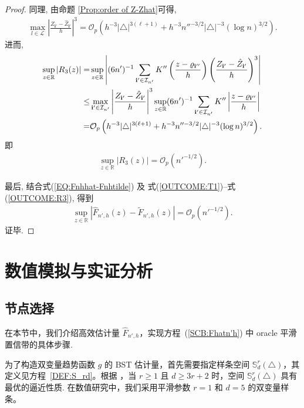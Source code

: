 \documentclass[a4paper,openay,14pt]{ctexbook}
\numberwithin{equation}{section}
\numberwithin{lem}{section}
\newcommand{\chapterwithfancyheader}[1]{  
    \chapter{#1} %
    \thispagestyle{fancy} %
}
\begin{document}
\begin{proof}
同理, 由命题 \ref{Prop:order of Z-Zhat}可得,
\begin{align*}
            \max_{l\in\mathcal{L}}\left\vert\frac{Z_{\mathbf{i}'}-\hat{Z}_{\mathbf{i}'}}{h}\right\vert^3 = \mathcal{O}_p\left(h^{-3}\vert\triangle\vert^{3(\ell+1)}+h^{-3}n''^{-3/2}\vert\triangle\vert^{-3}(\log n)^{3/2}\right).
        \end{align*}
进而,
\begin{align*}
            \sup_{z\in\mathbb{R}}\left\vert R_3(z)\right\vert = & \sup_{z\in\mathbb{R}}\left\vert (6n')^{-1}\sum_{\mathbf{i}'\in\mathcal{I}_{n'}}K''\left(\frac{z-\varrho_{\mathbf{i}''}}{h}\right)\left(\frac{Z_{\mathbf{i}'}-\hat{Z}_{\mathbf{i}'}}{h}\right)^3\right\vert\notag\\
            \leq& \max_{\mathbf{i}'\in\mathcal{I}_{n'}}\left\vert\frac{Z_{\mathbf{i}'}-\hat{Z}_{\mathbf{i}'}}{h}\right\vert^3\sup_{z\in\mathbb{R}}(6n')^{-1}\sum_{\mathbf{i}'\in\mathcal{I}_{n'}}K''\left\vert\frac{z-\varrho_{\mathbf{i}''}}{h}\right\vert\notag\\
            =& \mathcal{O}_p\left(h^{-3}\vert\triangle\vert^{3(\ell+1)}+h^{-3}n''^{-3/2}\vert\triangle\vert^{-3}(\log n)^{3/2}\right).\notag
        \end{align*}
        即
    \begin{align}\label{OUTCOME:R3}
                \sup_{z\in\mathbb{R}}\left\vert R_3(z)\right\vert = {\scriptstyle\mathcal{O}}_p(n'^{-1/2}).
            \end{align}

最后, 结合式(\ref{EQ:Fnhhat-Fnhtilde}) 及
式(\ref{OUTCOME:T1})–式(\ref{OUTCOME:R3}), 得到
\begin{align*}
    \sup_{z\in\mathbb{R}}
    \left|\hat{F}_{n',h}(z)-\tilde{F}_{n',h}(z)\right|
    ={\scriptstyle\mathcal{O}}_p\left(n'^{-1/2}\right).
\end{align*}
证毕.

\end{proof}


\chapterwithfancyheader{数值模拟与实证分析}\label{SEC: application}

\section{节点选择}
在本节中，我们介绍高效估计量 $\hat{F}_{n',h}$，实现方程~(\ref{SCB:Fhatn'h}) 中 oracle 平滑置信带的具体步骤.

为了构造双变量趋势函数 $g$ 的 BST 估计量，首先需要指定样条空间 $\mathbb{S}_{d}^{r}(\triangle)$，其定义见方程~\eqref{DEF:S_rd}。根据 \cite{lai2007spline}，当 $r \geq 1$ 且 $d \geq 3r + 2$ 时，空间 $\mathbb{S}_{d}^{r}(\triangle)$ 具有最优的逼近性质. 在数值研究中，我们采用平滑参数 $r = 1$ 和 $d = 5$ 的双变量样条。
\end{document}
